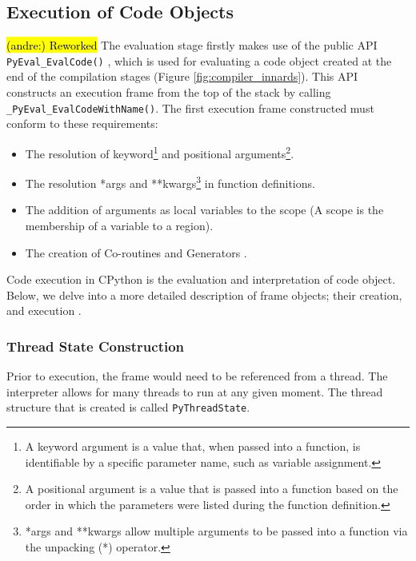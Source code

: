 \documentclass[12pt, a4paper]{report}
\DeclareRobustCommand{\andre}[1]{ {\begingroup\sethlcolor{BurntOrange}\hl{(andre:) #1}\endgroup} }
\theoremstyle{definition}
\theoremstyle{definition}%
\theoremstyle{definition}%
\theoremstyle{definition}%
\theoremstyle{definition}%
\theoremstyle{definition}%
\begin{document}
{        \subsection{Execution of Code Objects}
        \andre{Reworked}
        The evaluation stage firstly makes use of the public API \lstinline|PyEval_EvalCode()| \cite[lines 716--724]{ceval2022github}, which is used for evaluating a code object created 
        at the end of the compilation stages (Figure \ref{fig:compiler_innards}). This API constructs an execution frame from the top of the stack by calling \lstinline|_PyEval_EvalCodeWithName()|.
        The first execution frame constructed must conform to these requirements:
        \begin{itemize}
            \item The resolution of keyword\footnote{A keyword argument is a value that, when passed into a function, is identifiable by a specific parameter name, such as variable assignment.} 
            and positional arguments\footnote{A positional argument is a value that is passed into a function based on the order in which the parameters were listed during the function definition.}.
            \item The resolution *args and **kwargs\footnote{\label{footnote:kwargs_args}*args and **kwargs allow multiple arguments to be passed into a function via the unpacking (*) operator.} 
            in function definitions.
            \item The addition of arguments as local variables to the scope (A scope is the membership of a variable to a region).
            \item The creation of Co-routines and Generators \cite[pp.2--3]{tismer2000continuations}.
        \end{itemize} 
        Code execution in CPython is the evaluation and interpretation of code object. Below, we delve into a more detailed description of frame objects; their creation, and execution \cite{real2022python}.
        
            \subsubsection*{Thread State Construction}
            \par Prior to execution, the frame would need to be referenced from a thread. The interpreter allows for many threads to run at any given moment. The thread structure that is created is called 
            \lstinline|PyThreadState|.
            
}
\end{document}
